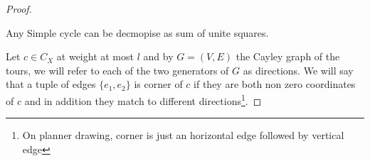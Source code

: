 \begin{proof}
  \begin{claim}
  Any Simple cycle can be decmopise as sum of unite squares.     
  \end{claim}

  Let $c \in C_{X}$ at weight at most $l$ and by $G = (V,E)$ the Cayley graph of the tours, we will refer to each of the two generators of $G$ as directions. We will say that a tuple of edges $\{e_{1},e_{2}\}$ is corner of $c$ if they are both non zero coordinates of $c$ and in addition they match to different directions\footnote{On planner drawing, corner is just an horizontal edge followed by vertical edge}.        
 
\end{proof}

%
%    

%
%

